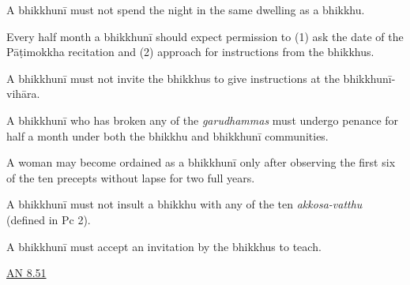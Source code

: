 \begin{exam}{\autoExamName}
\begin{problem}
\begin{manswers}{1}
     A bhikkhunī must not spend the night in the same dwelling as a bhikkhu. \eAns

     Every half month a bhikkhunī should expect permission to (1) ask the date of the Pāṭimokkha recitation and (2) approach for instructions from the bhikkhus. \eAns

     A bhikkhunī must not invite the bhikkhus to give instructions at the bhikkhunī-vihāra. \eAns

     A bhikkhunī who has broken any of the \emph{garudhammas} must undergo penance for half a month under both the bhikkhu and bhikkhunī communities. \eAns

     A woman may become ordained as a bhikkhunī only after observing the first six of the ten precepts without lapse for two full years. \eAns

     A bhikkhunī must not insult a bhikkhu with any of the ten \emph{akkosa-vatthu} (defined in Pc 2). \eAns

     A bhikkhunī must accept an invitation by the bhikkhus to teach. \eAns

    \eChoices
  \end{manswers}

  \begin{solution}
    \href{https://suttacentral.net/an8.51/en/sujato}{AN 8.51}
  \end{solution}

%
%
%
%
%
%
%
%


\end{problem}
\end{exam}
